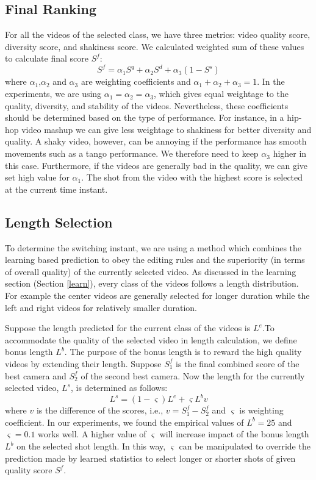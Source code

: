 \documentclass{sig-alternate}
\begin{document}
\subsection{Final Ranking}
For all the videos of the selected class, we have three metrics:
video quality score, diversity score, and shakiness score. We calculated weighted sum of these values to calculate final score $S^f$:
\begin{equation}
    S^f=\alpha_1S^q+\alpha_2S^d+\alpha_3(1-S^s)
\end{equation}
where $\alpha_1$,$\alpha_2$ and $\alpha_3$ are weighting coefficients and $\alpha_1+\alpha_2+\alpha_3=1$. In the experiments, we are using $\alpha_1=\alpha_2=\alpha_3$, which gives equal weightage to the quality, diversity, and stability
of the videos. Nevertheless, these coefficients should be determined based on the type of performance. For instance, in a hip-hop video mashup we can give less weightage to shakiness for better diversity and quality. A shaky video, however, can be annoying if the performance has smooth movements such as a tango performance. We therefore need to keep $\alpha_3$ higher in this case. Furthermore, if the videos are generally bad in the quality, we can give set high value for $\alpha_1$. The shot from the video with the highest score is selected at the current time instant.

\subsection{Length Selection}
To determine the switching instant, we are using a method which
combines the learning based prediction to obey the editing rules and the superiority (in terms of overall quality) of the currently selected video. As discussed in the learning section (Section \ref{learn}), every class of the videos follows a length distribution. For example the center videos are generally selected for longer duration while the left and right videos for relatively smaller duration.

Suppose the length predicted for the current class of the videos
is $L^e$.To accommodate the quality of the selected video in length calculation, we define bonus length $L^b$. The purpose of the bonus length is to reward the high quality videos by extending their length. Suppose $S_1^f$ is the final combined score of the best camera and $S_2^f$ of the second best camera. Now the length for the currently selected video, $L^s$, is determined as follows:
\begin{equation}
    L^s=(1-\varsigma)L^e+\varsigma L^bv
\end{equation}
where $v$ is the difference of the scores, i.e., $v=S_1^f-S_2^f$ and $\varsigma$ is weighting coefficient. In our experiments, we found the empirical values of $L^b=25$ and $\varsigma=0.1$ works well. A higher value of $\varsigma$ will increase impact of the bonus length $L^b$ on the selected shot length. In this way, $\varsigma$ can be manipulated to override the prediction
made by learned statistics to select longer or shorter shots of given quality score $S^f$.
\end{document}
